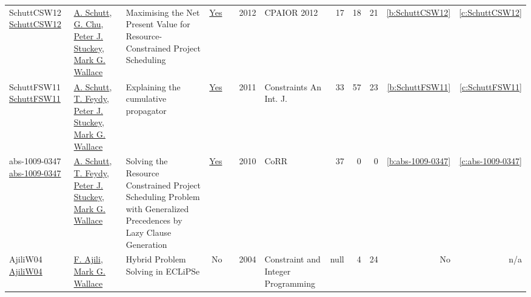 {\begin{longtable}{>{\raggedright\arraybackslash}p{3cm}>{\raggedright\arraybackslash}p{6cm}>{\raggedright\arraybackslash}p{6.5cm}rrrp{2.5cm}rrrrr}
SchuttCSW12 \href{https://doi.org/10.1007/978-3-642-29828-8\_24}{SchuttCSW12} & \hyperref[auth:a125]{A. Schutt}, \hyperref[auth:a349]{G. Chu}, \hyperref[auth:a126]{Peter J. Stuckey}, \hyperref[auth:a156]{Mark G. Wallace} & Maximising the Net Present Value for Resource-Constrained Project Scheduling & \href{../works/SchuttCSW12.pdf}{Yes} & \cite{SchuttCSW12} & 2012 & CPAIOR 2012 & 17 & 18 & 21 & \ref{b:SchuttCSW12} & \ref{c:SchuttCSW12}\\
SchuttFSW11 \href{https://doi.org/10.1007/s10601-010-9103-2}{SchuttFSW11} & \hyperref[auth:a125]{A. Schutt}, \hyperref[auth:a155]{T. Feydy}, \hyperref[auth:a126]{Peter J. Stuckey}, \hyperref[auth:a156]{Mark G. Wallace} & Explaining the cumulative propagator & \href{../works/SchuttFSW11.pdf}{Yes} & \cite{SchuttFSW11} & 2011 & Constraints An Int. J. & 33 & 57 & 23 & \ref{b:SchuttFSW11} & \ref{c:SchuttFSW11}\\
abs-1009-0347 \href{http://arxiv.org/abs/1009.0347}{abs-1009-0347} & \hyperref[auth:a125]{A. Schutt}, \hyperref[auth:a155]{T. Feydy}, \hyperref[auth:a126]{Peter J. Stuckey}, \hyperref[auth:a156]{Mark G. Wallace} & Solving the Resource Constrained Project Scheduling Problem with Generalized Precedences by Lazy Clause Generation & \href{../works/abs-1009-0347.pdf}{Yes} & \cite{abs-1009-0347} & 2010 & CoRR & 37 & 0 & 0 & \ref{b:abs-1009-0347} & \ref{c:abs-1009-0347}\\
AjiliW04 \href{http://dx.doi.org/10.1007/978-1-4419-8917-8_6}{AjiliW04} & \hyperref[auth:a972]{F. Ajili}, \hyperref[auth:a156]{Mark G. Wallace} & Hybrid Problem Solving in ECLiPSe & No & \cite{AjiliW04} & 2004 & Constraint and Integer Programming & null & 4 & 24 & No & n/a\\
\end{longtable}
}

\clearpage
